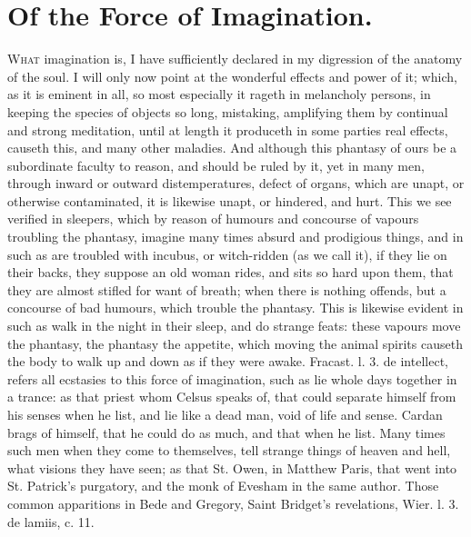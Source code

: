 {{%
\section{Of the Force of Imagination.}\label{sec:of-the-force-of-imagination}

\lettrine{W}{hat} imagination is, I have sufficiently declared in my digression of
the anatomy of the soul. I will only now point at the wonderful effects
and power of it; which, as it is eminent in all, so most especially it
rageth in melancholy persons, in keeping the species of objects so
long, mistaking, amplifying them by continual and strong
meditation, until at length it produceth in some parties real effects,
causeth this, and many other maladies. And although this phantasy of
ours be a subordinate faculty to reason, and should be ruled by it, yet
in many men, through inward or outward distemperatures, defect of
organs, which are unapt, or otherwise contaminated, it is likewise
unapt, or hindered, and hurt. This we see verified in sleepers, which
by reason of humours and concourse of vapours troubling the phantasy,
imagine many times absurd and prodigious things, and in such as are
troubled with incubus, or witch-ridden (as we call it), if they lie on
their backs, they suppose an old woman rides, and sits so hard upon
them, that they are almost stifled for want of breath; when there is
nothing offends, but a concourse of bad humours, which trouble the
phantasy. This is likewise evident in such as walk in the night in
their sleep, and do strange feats: these vapours move the
phantasy, the phantasy the appetite, which moving the animal spirits
causeth the body to walk up and down as if they were awake. \textlatin{Fracast. l.
3. de intellect}, refers all ecstasies to this force of imagination,
such as lie whole days together in a trance: as that priest whom
Celsus speaks of, that could separate himself from his senses
when he list, and lie like a dead man, void of life and sense. Cardan
brags of himself, that he could do as much, and that when he list. Many
times such men when they come to themselves, tell strange things of
heaven and hell, what visions they have seen; as that St. Owen, in
Matthew Paris, that went into St. Patrick's purgatory, and the monk of
Evesham in the same author. Those common apparitions in Bede and
Gregory, Saint Bridget's revelations, \textlatin{Wier. l. 3. de lamiis, c. 11}.

}}
